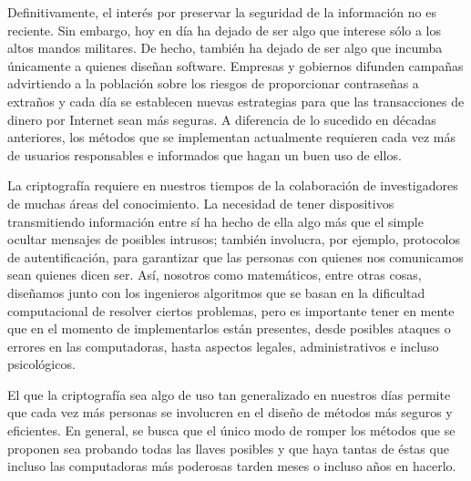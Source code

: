 \bigskip Definitivamente, el interés por preservar la seguridad de la información no es reciente. Sin embargo, hoy en día ha dejado de ser algo que interese sólo a los altos mandos militares. De hecho, también ha dejado de ser algo que incumba únicamente a quienes diseñan software. Empresas y gobiernos difunden campañas advirtiendo a la población sobre los riesgos de proporcionar contraseñas a extraños y cada día se establecen nuevas estrategias para que las transacciones de dinero por Internet sean más seguras. A diferencia de lo sucedido en décadas anteriores, los métodos que se implementan actualmente requieren cada vez más de usuarios responsables e informados que hagan un buen uso de ellos.

\bigskip La criptografía requiere en nuestros tiempos de la colaboración de investigadores de muchas áreas del conocimiento. La necesidad de tener dispositivos transmitiendo información entre sí ha hecho de ella algo más que el simple ocultar mensajes de posibles intrusos; también involucra, por ejemplo, protocolos de autentificación, para garantizar que las personas con quienes nos comunicamos sean quienes dicen ser. Así, nosotros como matemáticos, entre otras cosas, diseñamos junto con los ingenieros algoritmos que se basan en la dificultad computacional de resolver ciertos problemas, pero es importante tener en mente que en el momento de implementarlos están presentes, desde posibles ataques o errores en las computadoras, hasta aspectos legales, administrativos e incluso psicológicos.

\bigskip El que la criptografía sea algo de uso tan generalizado en nuestros días permite que cada vez más personas se involucren en el diseño de métodos más seguros y eficientes. En general, se busca que el único modo de romper los métodos que se proponen sea probando todas las llaves posibles y que haya tantas de éstas que incluso las computadoras más poderosas tarden meses o incluso años en hacerlo. 

